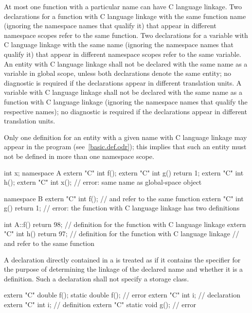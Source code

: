 \pnum
{}%
At most one function with a particular name can have C language linkage.
Two declarations for a function with C language linkage with the same
function name (ignoring the namespace names that qualify it) that appear
in different namespace scopes refer to the same function. Two
declarations for a variable with C language linkage with the same name
(ignoring the namespace names that qualify it) that appear in different
namespace scopes refer to the same variable.
An entity with C language linkage shall not be declared with the same name
as a variable in global scope, unless both declarations denote the same entity;
no diagnostic is required if the declarations appear in different translation units.
A variable with C language linkage shall not be declared with the same name as a
function with C language linkage (ignoring the namespace names that qualify the
respective names); no diagnostic is required if the declarations appear in
different translation units.
\begin{note}
Only
one definition for an entity with a given name
with C language linkage may appear in the
program (see~\ref{basic.def.odr});
this implies that such an entity
must not be defined in more
than one namespace scope.
\end{note}
\begin{example}
\begin{codeblock}
int x;
namespace A {
  extern "C" int f();
  extern "C" int g() { return 1; }
  extern "C" int h();
  extern "C" int x();               // error: same name as global-space object 
}

namespace B {
  extern "C" int f();               //  and  refer to the same function
  extern "C" int g() { return 1; }  // error: the function  with C language linkage has two definitions
}

int A::f() { return 98; }           // definition for the function  with C language linkage
extern "C" int h() { return 97; }   // definition for the function  with C language linkage
                                    //  and  refer to the same function
\end{codeblock}
\end{example}

\pnum
A declaration directly contained in a
is treated as if it contains the
specifier for the purpose of determining the linkage of the
declared name and whether it is a definition. Such a declaration shall
not specify a storage class.
\begin{example}
\begin{codeblock}
extern "C" double f();
static double f();                  // error
extern "C" int i;                   // declaration
extern "C" {
  int i;                            // definition
}
extern "C" static void g();         // error
\end{codeblock}
\end{example}

